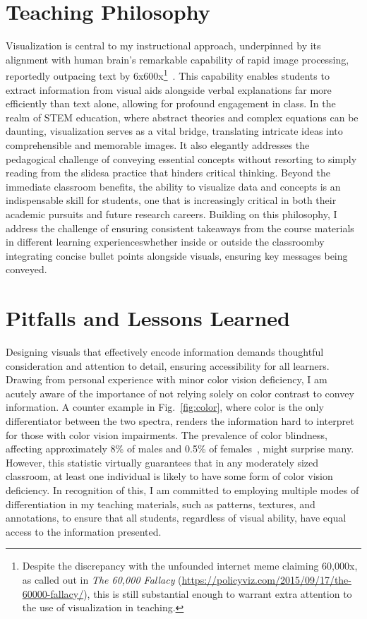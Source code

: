 \section{Teaching Philosophy}
Visualization is central to my instructional approach, underpinned by its alignment with human brain's remarkable capability of rapid image processing, reportedly outpacing text by 6x\textendash 600x\footnote{
    Despite the discrepancy with the unfounded internet meme claiming 60,000x, as called out in \emph{The 60,000 Fallacy} (\url{https://policyviz.com/2015/09/17/the-60000-fallacy/}), this is still substantial enough to warrant extra attention to the use of visualization in teaching.
}~\cite{ResearchPictureWorth}.
This capability enables students to extract information from visual aids alongside verbal explanations far more efficiently than text alone, allowing for profound engagement in class. In the realm of STEM education, where abstract theories and complex equations can be daunting, visualization serves as a vital bridge, translating intricate ideas into comprehensible and memorable images. It also elegantly addresses the pedagogical challenge of conveying essential concepts without resorting to simply reading from the slides\textemdash a practice that hinders critical thinking. Beyond the immediate classroom benefits, the ability to visualize data and concepts is an indispensable skill for students, one that is increasingly critical in both their academic pursuits and future research careers. Building on this philosophy, I address the challenge of ensuring consistent takeaways from the course materials in different learning experiences\textemdash whether inside or outside the classroom\textemdash by integrating concise bullet points alongside visuals, ensuring key messages being conveyed.

\section{Pitfalls and Lessons Learned}
Designing visuals that effectively encode information demands thoughtful consideration and attention to detail, ensuring accessibility for all learners. Drawing from personal experience with minor color vision deficiency, I am acutely aware of the importance of not relying solely on color contrast to convey information. A counter example in Fig.~\ref{fig:color}, where color is the only differentiator between the two spectra, renders the information hard to interpret for those with color vision impairments. The prevalence of color blindness, affecting approximately 8\% of males and 0.5\% of females~\cite{TypesColourBlindness}, might surprise many. However, this statistic virtually guarantees that in any moderately sized classroom, at least one individual is likely to have some form of color vision deficiency. In recognition of this, I am committed to employing multiple modes of differentiation in my teaching materials, such as patterns, textures, and annotations, to ensure that all students, regardless of visual ability, have equal access to the information presented.

